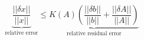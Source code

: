 $$
\underbrace{
\frac{||\delta x||}{||x||}
}_{\text{relative error}}
\leq
\underbrace{
K(A)\left(\frac{||\delta b||}{||b||} + \frac{||\delta A||}{||A||}\right)
}_{\text{relative residual error}}
$$
